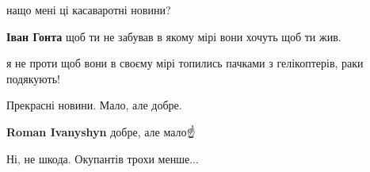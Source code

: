 \begin{itemize}
нащо мені ці касаваротні новини?

\begin{itemize}
 
\textbf{Іван Гонта} щоб ти не забував в якому мірі вони хочуть щоб ти жив.

\begin{itemize}
 
я не проти щоб вони в своєму мірі топились пачками з гелікоптерів, раки подякують!
\end{itemize}

\end{itemize}

 
Прекрасні новини.
Мало, але добре.

\begin{itemize}
 
\textbf{Roman Ivanyshyn} добре, але мало☝️\Laughey[1.0][white]
\end{itemize}

 
Ні, не шкода. Окупантів трохи менше...

 

\end{itemize}

